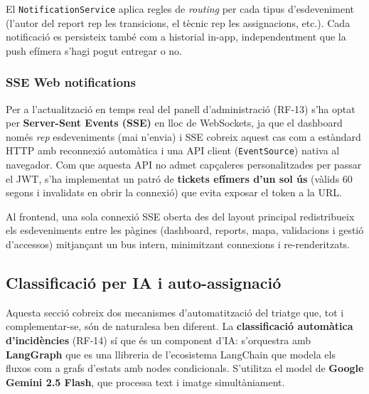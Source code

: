 \documentclass[10pt,a4paper,twocolumn,twoside]{article}
\begin{document}
		El \texttt{NotificationService} aplica regles de \textit{routing} per cada tipus d'esdeveniment (l'autor del report rep les transicions, el tècnic rep les assignacions, etc.). Cada notificació es persisteix també com a historial in-app, independentment que la push efímera s'hagi pogut entregar o no.
		
		\subsubsection{SSE Web notifications}
		
		Per a l'actualització en temps real del panell d'administració (RF-13) s'ha optat per \textbf{Server-Sent Events (SSE)}\cite{14} en lloc de WebSockets, ja que el dashboard només \textit{rep} esdeveniments (mai n'envia) i SSE cobreix aquest cas com a estàndard HTTP amb reconnexió automàtica i una API client (\texttt{EventSource}) nativa al navegador. Com que aquesta API no admet capçaleres personalitzades per passar el JWT, s'ha implementat un patró de \textbf{tickets efímers d'un sol ús} (vàlids 60 segons i invalidats en obrir la connexió) que evita exposar el token a la URL.
		
		
		Al frontend, una sola connexió SSE oberta des del layout principal redistribueix els esdeveniments entre les pàgines (dashboard, reports, mapa, validacions i gestió d'accessos) mitjançant un bus intern, minimitzant connexions i re-renderitzats. 
		
		\subsection{Classificació per IA i auto-assignació}
		
		Aquesta secció cobreix dos mecanismes d'automatització del triatge que, tot i complementar-se, són de naturalesa ben diferent. La \textbf{classificació automàtica d'incidències} (RF-14) sí que és un component d'IA: s'orquestra amb \textbf{LangGraph}\cite{15} que es una llibreria de l'ecosistema LangChain que modela els fluxos com a grafs d'estats amb nodes condicionals. S'utilitza el model de \textbf{Google Gemini 2.5 Flash}\cite{16}, que processa text i imatge simultàniament.
		
\end{document}
